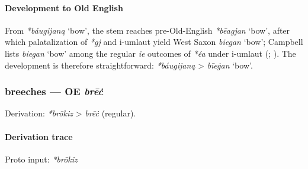 \documentclass[
  british,
  a4paper,
]{article}
\providecommand{\Recon}[1]{\emph{*#1}}
\begin{document}
\paragraph{Development to Old
English}\label{development-to-old-english-9}

From \Recon{báugijaną} `bow', the stem reaches pre-Old-English
\Recon{bēagjan} `bow', after which palatalization of \emph{*gj} and
i-umlaut yield West Saxon \emph{biegan} `bow'; Campbell lists
\emph{biegan} `bow' among the regular \emph{ie} outcomes of \emph{*éa}
under i-umlaut (;
). The development is
therefore straightforward: \emph{*báugijaną} \textgreater{}
\emph{bīeġan} `bow'.

\subsubsection{\texorpdfstring{breeches --- OE
\emph{brēċ}}{breeches --- OE brēċ}}\label{breeches-oe-brux113ux10b}

Derivation: \emph{*brōkiz} \textgreater{} \emph{brēċ} (regular).

\paragraph{Derivation trace}\label{derivation-trace-10}

Proto input: \emph{*brōkiz}

\begingroup
\setlength{\fboxsep}{6pt}
\end{document}
